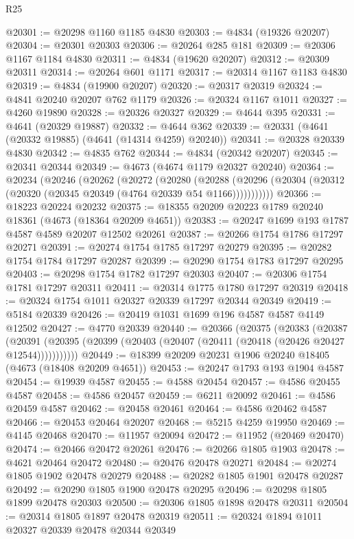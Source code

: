 \begin{lexlean}{R25}
\begin{coremodule}
@20301 := @20298 @1160 @1185 @4830
@20303 := @4834 (@19326 @20207)
@20304 := @20301 @20303
@20306 := @20264 @285 @181
@20309 := @20306 @1167 @1184 @4830
@20311 := @4834 (@19620 @20207)
@20312 := @20309 @20311
@20314 := @20264 @601 @1171
@20317 := @20314 @1167 @1183 @4830
@20319 := @4834 (@19900 @20207)
@20320 := @20317 @20319
@20324 := @4841 @20240 @20207 @762 @1179
@20326 := @20324 @1167 @1011
@20327 := @4260 @19890
@20328 := @20326 @20327
@20329 := @4644 @395
@20331 := @4641 (@20329 @19887)
@20332 := @4644 @362
@20339 := @20331 (@4641 (@20332 @19885) (@4641 (@14314 @4259) @20240))
@20341 := @20328 @20339 @4830
@20342 := @4835 @762
@20344 := @4834 (@20342 @20207)
@20345 := @20341 @20344
@20349 := @4673 (@4674 @1179 @20327 @20240)
@20364 := @20234
    (@20246
      (@20262
        (@20272
          (@20280
            (@20288
              (@20296 (@20304 (@20312 (@20320 (@20345 @20349 (@4764 @20339 @54 @1166)))))))))))
@20366 := @18223 @20224 @20232
@20375 := @18355 @20209 @20223 @1789 @20240 @18361 (@4673 (@18364 @20209 @4651))
@20383 := @20247 @1699 @193 @1787 @4587 @4589 @20207 @12502 @20261
@20387 := @20266 @1754 @1786 @17297 @20271
@20391 := @20274 @1754 @1785 @17297 @20279
@20395 := @20282 @1754 @1784 @17297 @20287
@20399 := @20290 @1754 @1783 @17297 @20295
@20403 := @20298 @1754 @1782 @17297 @20303
@20407 := @20306 @1754 @1781 @17297 @20311
@20411 := @20314 @1775 @1780 @17297 @20319
@20418 := @20324 @1754 @1011 @20327 @20339 @17297 @20344 @20349
@20419 := @5184 @20339
@20426 := @20419 @1031 @1699 @196 @4587 @4587 @4149 @12502
@20427 := @4770 @20339
@20440 := @20366
    (@20375
      (@20383
        (@20387
          (@20391 (@20395 (@20399 (@20403 (@20407 (@20411 (@20418 (@20426 @20427 @12544)))))))))))
@20449 := @18399 @20209 @20231 @1906 @20240 @18405 (@4673 (@18408 @20209 @4651))
@20453 := @20247 @1793 @193 @1904 @4587
@20454 := @19939 @4587
@20455 := @4588 @20454
@20457 := @4586 @20455 @4587
@20458 := @4586 @20457
@20459 := @6211 @20092
@20461 := @4586 @20459 @4587
@20462 := @20458 @20461
@20464 := @4586 @20462 @4587
@20466 := @20453 @20464 @20207
@20468 := @5215 @4259 @19950
@20469 := @4145 @20468
@20470 := @11957 @20094
@20472 := @11952 (@20469 @20470)
@20474 := @20466 @20472 @20261
@20476 := @20266 @1805 @1903
@20478 := @4621 @20464 @20472
@20480 := @20476 @20478 @20271
@20484 := @20274 @1805 @1902 @20478 @20279
@20488 := @20282 @1805 @1901 @20478 @20287
@20492 := @20290 @1805 @1900 @20478 @20295
@20496 := @20298 @1805 @1899 @20478 @20303
@20500 := @20306 @1805 @1898 @20478 @20311
@20504 := @20314 @1805 @1897 @20478 @20319
@20511 := @20324 @1894 @1011 @20327 @20339 @20478 @20344 @20349

\end{coremodule}
\end{lexlean}

